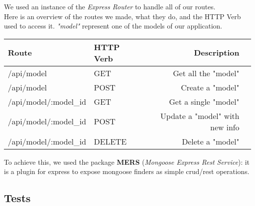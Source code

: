 We used an instance of the \emph{Express Router} to handle all of our routes.
\\Here is an overview of the routes we made, what they do, and the HTTP Verb used to access it. \emph{"model"} represent one of the models of our application.

\vspace{5mm}

\begin{tabular}{|l|l|rl|}
\hline
Route          &		 HTTP Verb        &		 Description		&       \\
\hline
/api/model 		&	GET       &		Get all the "model"       &      	\\
/api/model		&	POST       & 	Create a "model"       &     		\\
/api/model/:model\_id 	&	GET       & 	Get a single "model"       &     	\\
/api/model/:model\_id		&	POST       & 	Update a "model" with new info       &     	\\
/api/model/:model\_id		&	DELETE       & 	Delete a "model"       &     	\\
\hline
\end{tabular}

\vspace{5mm}

To achieve this, we used the package \textbf{MERS} (\emph{Mongoose Express Rest Service}): it is a plugin for express to expose mongoose finders as simple crud/rest operations.

\subsection{Tests}